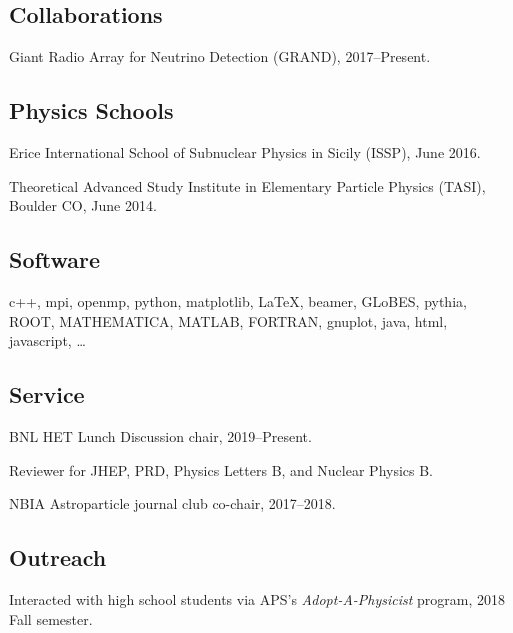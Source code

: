 \documentclass{article}
\renewenvironment{itemize}{
\begin{list}{}{
\setlength{\leftmargin}{.5em}}}{
\end{list}}
\begin{document}
\subsection*{Collaborations}
\begin{itemize}
\item Giant Radio Array for Neutrino Detection (GRAND), 2017--Present.
\end{itemize}

\subsection*{Physics Schools}
\begin{itemize}
\item Erice International School of Subnuclear Physics in Sicily (ISSP), June 2016.
\item Theoretical Advanced Study Institute in Elementary Particle Physics (TASI), Boulder CO, June 2014.
\end{itemize}

\subsection*{Software}
\begin{itemize}
\item 
c++, mpi, openmp, python, matplotlib, \LaTeX, beamer, GLoBES, pythia, ROOT, MATHEMATICA, MATLAB, FORTRAN, gnuplot, java, html, javascript, \dots
\end{itemize}

\subsection*{Service}
\begin{itemize}
\item BNL HET Lunch Discussion chair, 2019--Present.
\item Reviewer for JHEP, PRD, Physics Letters B, and Nuclear Physics B.
\item NBIA Astroparticle journal club co-chair, 2017--2018.
\end{itemize}

\subsection*{Outreach}
\begin{itemize}
\item Interacted with high school students via APS's \emph{Adopt-A-Physicist} program, 2018 Fall semester.
\end{itemize}
\end{document}
